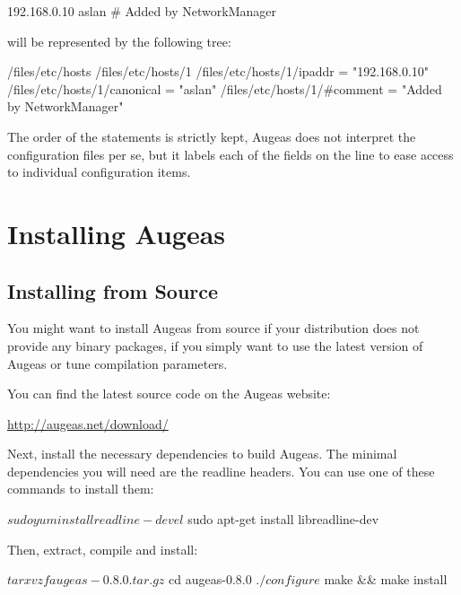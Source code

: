 \begin{bash}[]
192.168.0.10    aslan   # Added by NetworkManager
\end{bash}

will be represented by the following tree:

\begin{augtoolsh}[]
/files/etc/hosts
/files/etc/hosts/1
/files/etc/hosts/1/ipaddr = "192.168.0.10"
/files/etc/hosts/1/canonical = "aslan"
/files/etc/hosts/1/#comment = "Added by NetworkManager"
\end{augtoolsh}

The order of the statements is strictly kept, Augeas does not interpret the configuration files per se, but it labels each of the fields on the line to ease access to individual configuration items.

\section{Installing Augeas}

\label{sec:installing_augeas} 

\subsection{Installing from Source}

\label{sec:installing_from_source}

You might want to install Augeas from source if your distribution does not provide any binary packages, if you simply want to use the latest version of Augeas or tune compilation parameters.

You can find the latest source code on the Augeas website:

	\url{http://augeas.net/download/}

Next, install the necessary dependencies to build Augeas. The minimal dependencies you will need are the readline headers. You can use one of these commands to install them:

\begin{console}[]
$ sudo yum install readline-devel
$ sudo apt-get install libreadline-dev
\end{console}

Then, extract, compile and install:

\begin{console}[]
$ tar xvzf augeas-0.8.0.tar.gz
$ cd augeas-0.8.0
$ ./configure
$ make && make install
\end{console}



